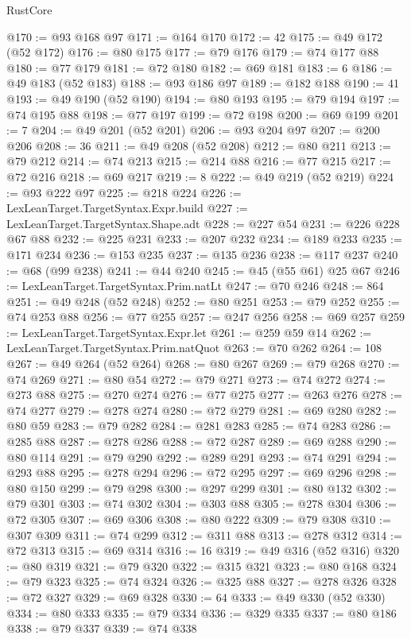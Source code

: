 \begin{lexlean}{RustCore}
\begin{coremodule}
@170 := @93 @168 @97
@171 := @164 @170
@172 := 42
@175 := @49 @172 (@52 @172)
@176 := @80 @175
@177 := @79 @176
@179 := @74 @177 @88
@180 := @77 @179
@181 := @72 @180
@182 := @69 @181
@183 := 6
@186 := @49 @183 (@52 @183)
@188 := @93 @186 @97
@189 := @182 @188
@190 := 41
@193 := @49 @190 (@52 @190)
@194 := @80 @193
@195 := @79 @194
@197 := @74 @195 @88
@198 := @77 @197
@199 := @72 @198
@200 := @69 @199
@201 := 7
@204 := @49 @201 (@52 @201)
@206 := @93 @204 @97
@207 := @200 @206
@208 := 36
@211 := @49 @208 (@52 @208)
@212 := @80 @211
@213 := @79 @212
@214 := @74 @213
@215 := @214 @88
@216 := @77 @215
@217 := @72 @216
@218 := @69 @217
@219 := 8
@222 := @49 @219 (@52 @219)
@224 := @93 @222 @97
@225 := @218 @224
@226 := LexLeanTarget.TargetSyntax.Expr.build
@227 := LexLeanTarget.TargetSyntax.Shape.adt
@228 := @227 @54
@231 := @226 @228 @67 @88
@232 := @225 @231
@233 := @207 @232
@234 := @189 @233
@235 := @171 @234
@236 := @153 @235
@237 := @135 @236
@238 := @117 @237
@240 := @68 (@99 @238)
@241 := @44 @240
@245 := @45 (@55 @61) @25 @67
@246 := LexLeanTarget.TargetSyntax.Prim.natLt
@247 := @70 @246
@248 := 864
@251 := @49 @248 (@52 @248)
@252 := @80 @251
@253 := @79 @252
@255 := @74 @253 @88
@256 := @77 @255
@257 := @247 @256
@258 := @69 @257
@259 := LexLeanTarget.TargetSyntax.Expr.let
@261 := @259 @59 @14
@262 := LexLeanTarget.TargetSyntax.Prim.natQuot
@263 := @70 @262
@264 := 108
@267 := @49 @264 (@52 @264)
@268 := @80 @267
@269 := @79 @268
@270 := @74 @269
@271 := @80 @54
@272 := @79 @271
@273 := @74 @272
@274 := @273 @88
@275 := @270 @274
@276 := @77 @275
@277 := @263 @276
@278 := @74 @277
@279 := @278 @274
@280 := @72 @279
@281 := @69 @280
@282 := @80 @59
@283 := @79 @282
@284 := @281 @283
@285 := @74 @283
@286 := @285 @88
@287 := @278 @286
@288 := @72 @287
@289 := @69 @288
@290 := @80 @114
@291 := @79 @290
@292 := @289 @291
@293 := @74 @291
@294 := @293 @88
@295 := @278 @294
@296 := @72 @295
@297 := @69 @296
@298 := @80 @150
@299 := @79 @298
@300 := @297 @299
@301 := @80 @132
@302 := @79 @301
@303 := @74 @302
@304 := @303 @88
@305 := @278 @304
@306 := @72 @305
@307 := @69 @306
@308 := @80 @222
@309 := @79 @308
@310 := @307 @309
@311 := @74 @299
@312 := @311 @88
@313 := @278 @312
@314 := @72 @313
@315 := @69 @314
@316 := 16
@319 := @49 @316 (@52 @316)
@320 := @80 @319
@321 := @79 @320
@322 := @315 @321
@323 := @80 @168
@324 := @79 @323
@325 := @74 @324
@326 := @325 @88
@327 := @278 @326
@328 := @72 @327
@329 := @69 @328
@330 := 64
@333 := @49 @330 (@52 @330)
@334 := @80 @333
@335 := @79 @334
@336 := @329 @335
@337 := @80 @186
@338 := @79 @337
@339 := @74 @338

\end{coremodule}
\end{lexlean}
